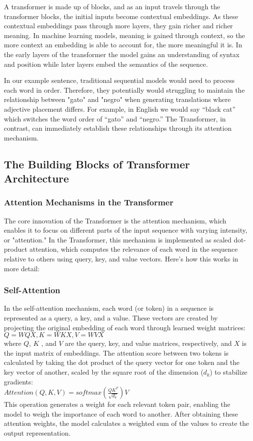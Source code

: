A transformer is made up of blocks, and as an input travels through the transformer blocks, the initial inputs become contextual embeddings. As these contextual embeddings pass through more layers, they gain richer and richer meaning. In machine learning models, meaning is gained through context, so the more context an embedding is able to account for, the more meaningful it is. In the early layers of the transformer the model gains an understanding of syntax and position while later layers embed the semantics of the sequence. 

In our example sentence, traditional sequential models would need to process each word in order. Therefore, they potentially would struggling to maintain the relationship between "gato" and "negro" when generating translations where adjective placement differs. For example, in English we would say “black cat” which switches the word order of “gato” and “negro.” The Transformer, in contrast, can immediately establish these relationships through its attention mechanism.

\subsection{The Building Blocks of Transformer Architecture}

\subsubsection{Attention Mechanisms in the Transformer}
The core innovation of the Transformer is the attention mechanism, which enables it to focus on different parts of the input sequence with varying intensity, or "attention." In the Transformer, this mechanism is implemented as scaled dot-product attention, which computes the relevance of each word in the sequence relative to others using query, key, and value vectors. Here’s how this works in more detail:

\subsubsection{Self-Attention}
In the self-attention mechanism, each word (or token) in a sequence is represented as a query, a key, and a value. These vectors are created by projecting the original embedding of each word through learned weight matrices: \\
\tab[1cm]$Q =WQX, K =WKX, V = WVX $ \\
where $Q$, $K$ , and $V$ are the query, key, and value matrices, respectively, and $X$ is the input matrix of embeddings. The attention score between two tokens is calculated by taking the dot product of the query vector for one token and the key vector of another, scaled by the square root of the dimension ($d_k$) to stabilize gradients:\\
\tab[1cm]$Attention(Q, K, V) = softmax(\frac{QK^T}{\sqrt{d_k}})V$ \\
This operation generates a weight for each relevant token pair, enabling the model to weigh the importance of each word to another. After obtaining these attention weights, the model calculates a weighted sum of the values to create the output representation.

